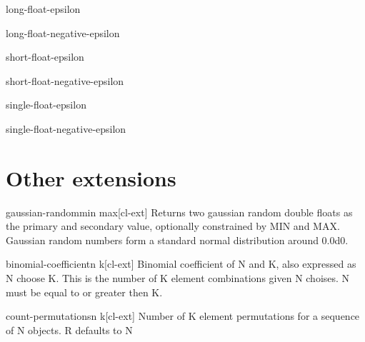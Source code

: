 \documentclass[10pt,english]{book}
\begin{document}
\begin{constant}{long-float-epsilon}{}
  
\end{constant}

\begin{constant}{long-float-negative-epsilon}{}
  
\end{constant}

\begin{constant}{short-float-epsilon}{}
  
\end{constant}

\begin{constant}{short-float-negative-epsilon}{}
  
\end{constant}

\begin{constant}{single-float-epsilon}{}
  
\end{constant}

\begin{constant}{single-float-negative-epsilon}{}
  
\end{constant}

\section{Other extensions}
\label{sec:other-extensions}

\begin{function}{gaussian-random}{\op min max}[cl-ext]
  Returns two gaussian random double floats as the primary and secondary value,
optionally constrained by MIN and MAX. Gaussian random numbers form a standard
normal distribution around 0.0d0.
\end{function}

\begin{function}{binomial-coefficient}{n k}[cl-ext]
  Binomial coefficient of N and K, also expressed as N choose K. This is the
number of K element combinations given N choises. N must be equal to or
greater then K.
\end{function}

\begin{function}{count-permutations}{n \op k}[cl-ext]
  Number of K element permutations for a sequence of N objects.
R defaults to N
\end{function}
\end{document}
